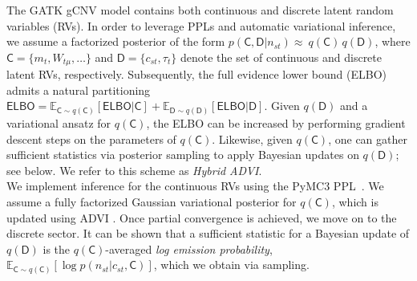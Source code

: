 \documentclass[sigplan]{acmart}\settopmatter{printfolios=true,printccs=false,printacmref=false}
\begin{document}

 The GATK gCNV model contains both continuous and discrete latent random variables (RVs). In order to leverage PPLs and automatic variational inference, we assume a factorized posterior of the form $p(\mathsf{C}, \mathsf{D} | n_{st}) \approx~q(\mathsf{C})\, q(\mathsf{D})$, where $\mathsf{C} = \{m_t, W_{t\mu}, \ldots\}$ and $\mathsf{D} = \{c_{st}, \tau_t\}$ denote the set of continuous and discrete latent RVs, respectively. Subsequently, the full evidence lower bound (ELBO) admits a natural partitioning $\mathsf{ELBO} = \mathbb{E}_{\mathsf{C} \sim q(\mathsf{C})}[\mathsf{ELBO}|\mathsf{C}] + \mathbb{E}_{\mathsf{D} \sim q(\mathsf{D})}[\mathsf{ELBO}|\mathsf{D}]$. Given $q(\mathsf{D})$ and a variational ansatz for $q(\mathsf{C})$, the ELBO can be increased by performing gradient descent steps on the parameters of $q(\mathsf{C})$. Likewise, given $q(\mathsf{C})$, one can gather sufficient statistics via posterior sampling to apply Bayesian updates on $q(\mathsf{D})$; see below. We refer to this scheme as {\em Hybrid ADVI}.\\

 We implement inference for the continuous RVs using the PyMC3 PPL~\cite{salvatier_probabilistic_2016}. We assume a fully factorized Gaussian variational posterior for $q(\mathsf{C})$, which is updated using ADVI \cite{Kucukelbir:2017:ADV:3122009.3122023}. Once partial convergence is achieved, we move on to the discrete sector. It can be shown that a sufficient statistic for a Bayesian update of $q(\mathsf{D})$ is the $q(\mathsf{C})$-averaged {\em log emission probability}, $\mathbb{E}_{\mathsf{C} \sim q(\mathsf{C})}[\log p(n_{st} | c_{st}, \mathsf{C})]$, which we obtain via sampling.\\
\end{document}
